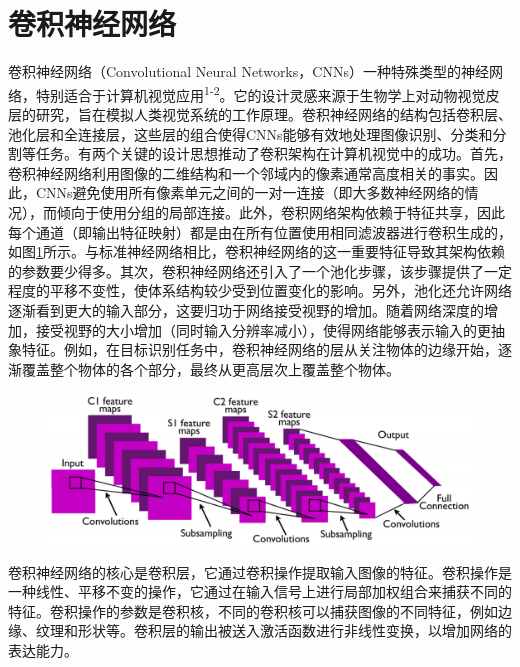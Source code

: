 \section{卷积神经网络}
卷积神经网络（Convolutional Neural Networks，CNNs）一种特殊类型的神经网络，特别适合于计算机视觉应用\textsuperscript{\cite{image}1-2}。它的设计灵感来源于生物学上对动物视觉皮层的研究，旨在模拟人类视觉系统的工作原理。卷积神经网络的结构包括卷积层、池化层和全连接层，这些层的组合使得CNNs能够有效地处理图像识别、分类和分割等任务。有两个关键的设计思想推动了卷积架构在计算机视觉中的成功。首先，卷积神经网络利用图像的二维结构和一个邻域内的像素通常高度相关的事实。因此，CNNs避免使用所有像素单元之间的一对一连接（即大多数神经网络的情况），而倾向于使用分组的局部连接。此外，卷积网络架构依赖于特征共享，因此每个通道（即输出特征映射）都是由在所有位置使用相同滤波器进行卷积生成的，如图\ref{fig:conv1}所示。与标准神经网络相比，卷积神经网络的这一重要特征导致其架构依赖的参数要少得多。其次，卷积神经网络还引入了一个池化步骤，该步骤提供了一定程度的平移不变性，使体系结构较少受到位置变化的影响。另外，池化还允许网络逐渐看到更大的输入部分，这要归功于网络接受视野的增加。随着网络深度的增加，接受视野的大小增加（同时输入分辨率减小），使得网络能够表示输入的更抽象特征。例如，在目标识别任务中，卷积神经网络的层从关注物体的边缘开始，逐渐覆盖整个物体的各个部分，最终从更高层次上覆盖整个物体。

\begin{figure}[h]
	\centering 
	\includegraphics[width=15cm]{fig/ch2/conv1.png}
	\label{fig:conv1}
\end{figure}
\vspace{-0.5cm}

卷积神经网络的核心是卷积层，它通过卷积操作提取输入图像的特征。卷积操作是一种线性、平移不变的操作，它通过在输入信号上进行局部加权组合来捕获不同的特征。卷积操作的参数是卷积核，不同的卷积核可以捕获图像的不同特征，例如边缘、纹理和形状等。卷积层的输出被送入激活函数进行非线性变换，以增加网络的表达能力。

